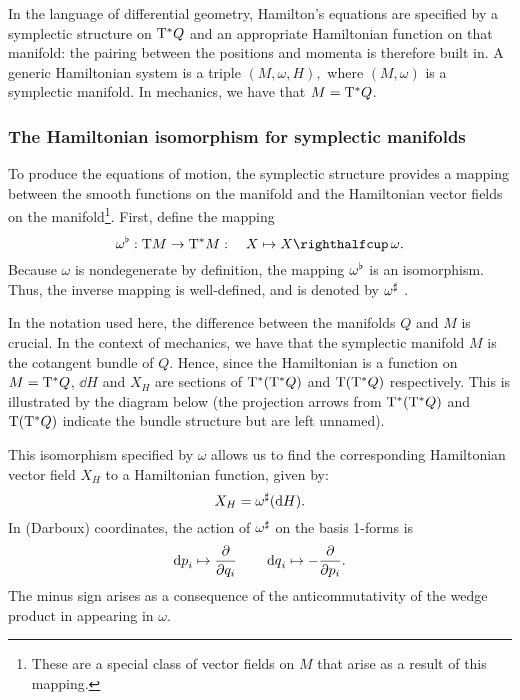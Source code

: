 In the language of differential geometry, Hamilton's equations are specified by a symplectic structure on $\mathrm{T}^*Q$ and an appropriate Hamiltonian function on that manifold: the pairing between the positions and momenta is therefore built in. A generic Hamiltonian system is a triple $ (M, \omega, H), $ where $ (M, \omega) $ is a symplectic manifold. In mechanics, we have that $ M = \mathrm{T}^*Q $.

\subsubsection{The Hamiltonian isomorphism for symplectic manifolds}
To produce the equations of motion, the symplectic structure provides a mapping between the smooth functions on the manifold and the Hamiltonian vector fields on the manifold\footnote{These are a special class of vector fields on $M$ that arise as a result of this mapping.}. First, define the mapping 
\begin{equation}
    \toDual{\omega}: \tbundle{M} \to \ctbundle{M}:\quad X \mapsto \intpr{X}{\omega}. 
    \label{eq:symplectic_isomorphism}
\end{equation}
Because $\omega$ is nondegenerate by definition, the mapping $\omega^\flat$ is an isomorphism. Thus, the inverse mapping is well-defined, and is denoted by $\omega^\sharp$ \cite{Libermann1987}.

In the notation used here, the difference between the manifolds $Q$ and $M$ is crucial. In the context of mechanics, we have that the symplectic manifold $M$ is the cotangent bundle of $Q$. Hence, since the Hamiltonian is a function on $M = \mathrm{T}^*Q$, $\dd{H}$ and $X_H$ are sections of $\mathrm{T}^*\qty(\mathrm{T}^*Q)$ and $\mathrm{T}\qty(\mathrm{T}^*Q)$ respectively. This is illustrated by the diagram below (the projection arrows from $\mathrm{T}^*\qty(\mathrm{T}^*Q)$ and $\mathrm{T}\qty(\mathrm{T}^*Q)$ indicate the bundle structure but are left unnamed).
\begin{center}
\end{center}
This isomorphism specified by $\omega$ allows us to find the corresponding Hamiltonian vector field $X_H$ to a Hamiltonian function, given by:
\begin{equation} 
    X_H = \omega^\sharp(\dd{H}). 
    \label{eq:symplectic_hamiltonian_vf}
\end{equation}
In (Darboux) coordinates, the action of $ \omega^\sharp$ on the basis 1-forms is  
$$ \dd{p}_i \mapsto \pdv{}{q_i} \qquad \dd{q}_i \mapsto -\pdv{}{p_i}. $$ 
The minus sign arises as a consequence of the anticommutativity of the wedge product in appearing in $\omega$.

